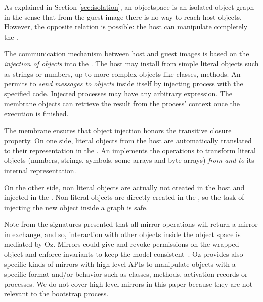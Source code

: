 As explained in Section \ref{sec:isolation}, an objectspace is an isolated object graph in the sense that from the guest image there is no way to reach host objects. However, the opposite relation is possible: the host can manipulate completely the \objectspace.

The communication mechanism between host and guest images is based on the \emph{injection of objects} into the \objectspace. The host may install from simple literal objects such as strings or numbers, up to more complex objects like classes, methods. An \objectspace permits to \emph{send messages to objects} inside itself by injecting process with the specified code. Injected processes may have any arbitrary expression. The membrane objects can retrieve the result from the process' context once the execution is finished.

The \objectspace membrane ensures that object injection honors the transitive closure property. On one side, literal objects from the host are automatically translated to their representation in the \objectspace. An \objectspace implements the operations to transform literal objects (numbers, strings, symbols, some arrays and byte arrays) \emph{from and to} its internal representation.

On the other side, non literal objects are actually not created in the host and injected in the \objectspace. Non literal objects are directly created in the \objectspace, so the task of injecting the new object inside a graph is safe.




Note from the signatures presented that all mirror operations will return a mirror in exchange, and so, interaction with other objects inside the object space is mediated by Oz. Mirrors could give and revoke permissions on the wrapped object and enforce invariants to keep the model consistent~\cite{Teru13a}.
Oz provides also specific kinds of mirrors with high level APIs to manipulate objects with a specific format and/or behavior such as classes, methods, activation records or processes. We do not cover high level mirrors in this paper because they are not relevant to the bootstrap process.


